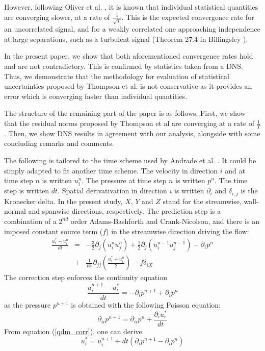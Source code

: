 \documentclass[aip,pof,reprint]{revtex4-1}
\begin{document}
However, following Oliver et al. \cite{oliver}, it is known that individual statistical quantities are converging slower, at a rate of $\frac{1}{\sqrt{T}}$.
This is the expected convergence rate for an uncorrelated signal, and for a weakly correlated one approaching independence at large separations, such as a turbulent signal {\color{red}(Theorem 27.4 in Billingsley \citep{billingsley2008probability})}.

In the present paper, we show that both aforementioned convergence rates hold and are not contradictory.
This is confirmed by statistics taken from a DNS.
Thus, we demonstrate that the methodology for evaluation of statistical uncertainties proposed by Thompson et al. \cite{thompson} is not conservative as it provides an error which is converging faster than individual quantities.

The structure of the remaining part of the paper is as follows.
First, we show that the residual norms proposed by Thompson et al \cite{thompson} are converging at a rate of $\frac{1}{T}$.
Then, we show DNS results in agreement with our analysis, alongside with some concluding remarks and comments.

The following is tailored to the time scheme used by Andrade et al. \cite{andrade}.
It could be simply adapted to fit another time scheme.
{\color{red}The velocity in direction $i$ and at time step $n$ is written $u_i^n$.
The pressure at time step $n$ is written $p^n$.
The time step is written $dt$.
Spatial derivativation in direction $i$ is written $\partial_i$ and $\delta_{i,j}$ is the Kronecker delta.}
In the present study, $X$, $Y$ and $Z$ stand for the streamwise, wall-normal and spanwise directions, respectively.
The prediction step is a combination of a $2^{nd}$ order Adams-Bashforth and Crank-Nicolson, and there is an imposed constant source term ($f$) in the streamwise direction driving the flow:
\begin{eqnarray}
\label{qdm_pred}
\frac{u_i^*-u_i^n}{dt}
& = &
- \frac{3}{2} \partial_j \left( u_i^n u_j^n \right)
+ \frac{1}{2} \partial_j \left( u_i^{n-1} u_j^{n-1} \right)
- \partial_i p^n \nonumber \\
& + & \frac{1}{Re} \partial_{jj} \left( \frac{u_i^* + u_i^n}{2} \right)
- f \delta_{iX}
\end{eqnarray}
The correction step enforces the continuity equation
\begin{equation}
\label{qdm_corr}
\frac{u_i^{n+1}-u_i^*}{dt} = - \partial_i p^{n+1} + \partial_i p^{n}
\end{equation}
as the pressure $p^{n+1}$ is obtained with the following Poisson equation:
\begin{equation}
\label{qdm_poisson}
\partial_{ii} p^{n+1} = \partial_{ii} p^{n} + \frac{\partial_i u_i^*}{dt}
\end{equation}
{\color{red}
From equation (\ref{qdm_corr}), one can derive
\begin{equation}
\label{qdm_ustar}
u_i^* = u_i^{n+1} + dt \left( \partial_i p^{n+1} - \partial_i p^{n} \right)
\end{equation}
}
\end{document}

